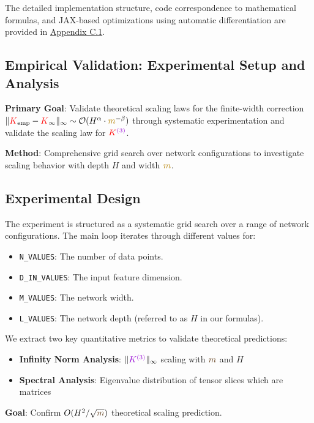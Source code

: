 \documentclass[a4paper]{article}
\newcommand{\m}{\textcolor{weightcolor}{m}}
\theoremstyle{plain}
\theoremstyle{definition}
\theoremstyle{remark}
\begin{document}
The detailed implementation structure, code correspondence to mathematical formulas, and JAX-based optimizations using automatic differentiation are provided in \hyperref[sec:appendix_implementation]{Appendix C.1}.

\subsection{Empirical Validation: Experimental Setup and Analysis}
\begin{tcolorbox}[colback=blue!10,colframe=blue!60!black,title={\textbf{Empirical Validation Objective}},enhanced,drop shadow]
\textbf{Primary Goal}: Validate theoretical scaling laws for the finite-width correction $\|\textcolor{red}{K}_{\text{emp}} - \textcolor{red}{K}_{\infty}\|_\infty \sim \mathcal{O}(H^{\alpha} \cdot \textcolor{darkyellow}{m}^{-\beta})$ through systematic experimentation and validate the scaling law for $\textcolor{k3color}{\textcolor{red}{K}^{(3)}}$.

\textbf{Method}: Comprehensive grid search over network configurations to investigate scaling behavior with depth $H$ and width $\textcolor{darkyellow}{m}$.
\end{tcolorbox}




\subsection{Experimental Design}

The experiment is structured as a systematic grid search over a range of network configurations. The main loop iterates through different values for:
\begin{itemize}
    \item \texttt{N\_VALUES}: The number of data points.
    \item \texttt{D\_IN\_VALUES}: The input feature dimension.
    \item \texttt{M\_VALUES}: The network width.
    \item \texttt{L\_VALUES}: The network depth (referred to as $H$ in our formulas).
\end{itemize}

\begin{tcolorbox}[colback=green!10,colframe=green!60!black,title={\textbf{Two-Metric Validation Strategy}},enhanced,drop shadow]
We extract two key quantitative metrics to validate theoretical predictions:
\begin{itemize}
\item \textbf{Infinity Norm Analysis}: $\|\textcolor{k3color}{K^{(3)}}\|_\infty$ scaling with $\m$ and $H$
\item \textbf{Spectral Analysis}: Eigenvalue distribution of tensor slices which are matrices
\end{itemize}
\textbf{Goal}: Confirm $O(H^2/\sqrt{\m})$ theoretical scaling prediction.
\end{tcolorbox}
\end{document}
